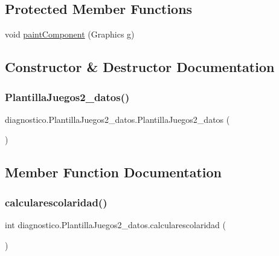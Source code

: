 \subsection*{Protected Member Functions}
\begin{DoxyCompactItemize}
\item 
void \mbox{\hyperlink{classdiagnostico_1_1_plantilla_juegos2__datos_a5034ee63a5786dfce74fd3d0cd9bfd2a}{paint\+Component}} (Graphics g)
\end{DoxyCompactItemize}


\subsection{Constructor \& Destructor Documentation}
\mbox{\label{classdiagnostico_1_1_plantilla_juegos2__datos_a8bca8ff60e3c597803a02ac2dd3393ea}} 
\subsubsection{\texorpdfstring{Plantilla\+Juegos2\+\_\+datos()}{PlantillaJuegos2\_datos()}}
{\footnotesize\ttfamily diagnostico.\+Plantilla\+Juegos2\+\_\+datos.\+Plantilla\+Juegos2\+\_\+datos (\begin{DoxyParamCaption}{ }\end{DoxyParamCaption})}



\subsection{Member Function Documentation}
\mbox{\label{classdiagnostico_1_1_plantilla_juegos2__datos_a9f59c790e2208528d47445aed90256c1}} 
\subsubsection{\texorpdfstring{calcularescolaridad()}{calcularescolaridad()}}
{\footnotesize\ttfamily int diagnostico.\+Plantilla\+Juegos2\+\_\+datos.\+calcularescolaridad (\begin{DoxyParamCaption}{ }\end{DoxyParamCaption})}

